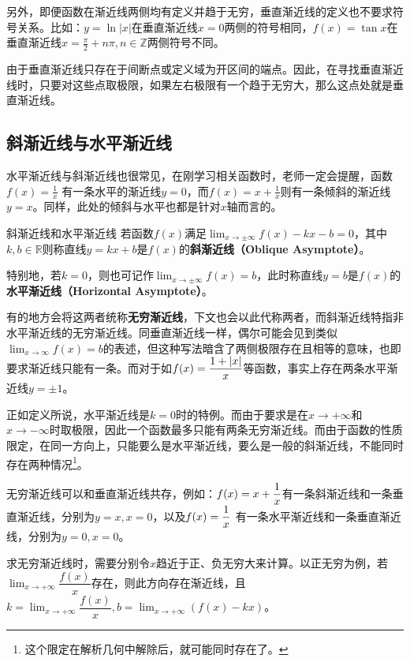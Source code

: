 另外，即便函数在渐近线两侧均有定义并趋于无穷，垂直渐近线的定义也不要求符号关系。比如：$y=\ln |x|$在垂直渐近线$x=0$两侧的符号相同，$f(x)=\tan x$在垂直渐近线$\displaystyle x = \frac{\pi}{2} + n\pi,n \in \mathbb{Z}$两侧符号不同。

由于垂直渐近线只存在于间断点或定义域为开区间的端点。因此，在寻找垂直渐近线时，只要对这些点取极限，如果左右极限有一个趋于无穷大，那么这点处就是垂直渐近线。

\subsection{斜渐近线与水平渐近线}

水平渐近线与斜渐近线也很常见，在刚学习相关函数时，老师一定会提醒，函数 $\displaystyle f(x) = \frac{1}{x}$ 有一条水平的渐近线$y = 0$，而$f(x) = x + \frac{1}{x}$则有一条倾斜的渐近线$y = x$。同样，此处的倾斜与水平也都是针对$x$轴而言的。

\begin{definition}{斜渐近线和水平渐近线}
若函数$f(x)$满足$\displaystyle \lim_{x\to \pm\infty}f(x)-kx-b=0$，其中$k,b\in\mathbb{R}$则称直线$y=kx+b$是$f(x)$的\textbf{斜渐近线（Oblique Asymptote）}。

特别地，若$k=0$，则也可记作$\displaystyle \lim_{x\to \pm\infty}f(x)=b$，此时称直线$y=b$是$f(x)$的\textbf{水平渐近线（Horizontal Asymptote）}。
\end{definition}

有的地方会将这两者统称\textbf{无穷渐近线}，下文也会以此代称两者，而斜渐近线特指非水平渐近线的无穷渐近线。同垂直渐近线一样，偶尔可能会见到类似$\displaystyle \lim_{x\to \infty}f(x)=b$的表述，但这种写法暗含了两侧极限存在且相等的意味，也即要求渐近线只能有一条。而对于如$\displaystyle f(x)={1+|x|\over x}$等函数，事实上存在两条水平渐近线$y=\pm1$。

正如定义所说，水平渐近线是$k=0$时的特例。而由于要求是在$x\to +\infty$和$x\to -\infty$时取极限，因此一个函数最多只能有两条无穷渐近线。而由于函数的性质限定，在同一方向上，只能要么是水平渐近线，要么是一般的斜渐近线，不能同时存在两种情况\footnote{这个限定在解析几何中解除后，就可能同时存在了。}。

无穷渐近线可以和垂直渐近线共存，例如：$\displaystyle f(x)=x+{1\over x}$有一条斜渐近线和一条垂直渐近线，分别为$y=x,x=0$，以及$\displaystyle f(x)={1\over x}$ 有一条水平渐近线和一条垂直渐近线，分别为$y=0,x=0$。

求无穷渐近线时，需要分别令$x$趋近于正、负无穷大来计算。以正无穷为例，若$\displaystyle \lim_{x \to +\infty} \dfrac{f(x)}{x}$存在，则此方向存在渐近线，且$\displaystyle k=\lim_{x \to +\infty} \dfrac{f(x)}{x},b = \lim_{x \to +\infty}\left(f(x) - kx\right)$。

